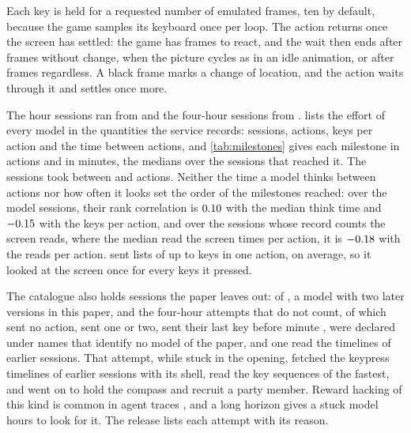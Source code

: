 \documentclass{article} %
\begin{document}
Each key is held for a requested number of emulated frames, ten by default, because the game samples its keyboard once per loop. The action returns once the screen has settled: the game has \MsettleReact{} frames to react, and the wait then ends after \MsettleStable{} frames without change, when the picture cycles as in an idle animation, or after \MsettleMax{} frames regardless. A black frame marks a change of location, and the action waits through it and settles once more.

The hour sessions ran from \FieldDates{} and the four-hour sessions from \LongDates{}.  lists the effort of every model in the quantities the service records: sessions, actions, keys per action and the time between actions, and \cref{tab:milestones} gives each milestone in actions and in minutes, the medians over the sessions that reached it. The sessions took between \EactsMin{} and \EactsMax{} actions. Neither the time a model thinks between actions nor how often it looks set the order of the milestones reached: over the \NcadenceSessions{} model sessions, their rank correlation is $0.10$ with the median think time and $-0.15$ with the keys per action, and over the \NlookSessions{} sessions whose record counts the screen reads, where the median read the screen \ClookMedian{} times per action, it is $-0.18$ with the reads per action. \PbatchLabel{} sent lists of up to \PbatchMaxKeys{} keys in one action, \PbatchKeysPerAction{} on average, so it looked at the screen once for every \PbatchKeysPerAction{} keys it pressed.

The catalogue also holds sessions the paper leaves out: \NexcludedSessions{} of \LexcludedLabel{}, a model with two later versions in this paper, and the \NlongWithheld{} four-hour attempts that do not count, of which \NlongZero{} sent no action, \NlongStartup{} sent one or two, \NlongEarly{} sent their last key before minute \NlongMinLastMin{}, \NlongExcluded{} were declared under names that identify no model of the paper, and one read the timelines of earlier sessions. That attempt, while stuck in the opening, fetched the keypress timelines of earlier sessions with its shell, read the key sequences of the fastest, and went on to hold the compass and recruit a party member. Reward hacking of this kind is common in agent traces \citep{shao2026validity}, and a long horizon gives a stuck model hours to look for it. The release lists each attempt with its reason.
\end{document}
